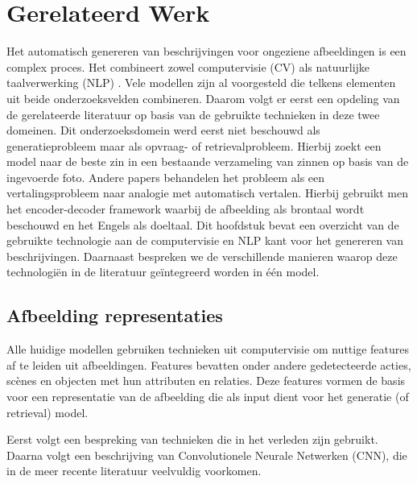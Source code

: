 \chapter{Gerelateerd Werk}
\label{hoofdstuk:related}
Het automatisch genereren van beschrijvingen voor ongeziene afbeeldingen is een complex proces. Het combineert zowel computervisie (CV) als natuurlijke taalverwerking (NLP) . Vele modellen zijn al voorgesteld die telkens elementen uit beide onderzoeksvelden combineren. Daarom volgt er eerst een opdeling van de gerelateerde literatuur op basis van de gebruikte technieken in deze twee domeinen. 
Dit onderzoeksdomein werd eerst niet beschouwd als generatieprobleem maar als opvraag- of retrievalprobleem. Hierbij zoekt een model naar de beste zin in een bestaande verzameling van zinnen op basis van de ingevoerde foto.\cite{Hodosh2013}  Andere papers behandelen het probleem als een vertalingsprobleem naar analogie met automatisch vertalen. Hierbij gebruikt men het encoder-decoder framework waarbij de afbeelding als brontaal wordt beschouwd en het Engels als doeltaal.
Dit hoofdstuk bevat een overzicht van de gebruikte technologie aan de computervisie en NLP kant voor het genereren van beschrijvingen. Daarnaast bespreken we de verschillende manieren waarop deze technologi\"en in de literatuur ge\"integreerd worden in \'e\'en model.

\section{Afbeelding representaties}
Alle huidige modellen gebruiken technieken uit computervisie om nuttige features af te leiden uit afbeeldingen. Features bevatten onder andere gedetecteerde acties, sc\`enes en objecten met hun attributen en relaties. \cite{Bernardi}  Deze features vormen de basis voor een representatie van de afbeelding die als input dient voor het generatie (of retrieval) model. 

Eerst volgt een bespreking van technieken die in het verleden zijn gebruikt. Daarna volgt een beschrijving van Convolutionele Neurale Netwerken (CNN), die in de meer recente literatuur veelvuldig voorkomen.


